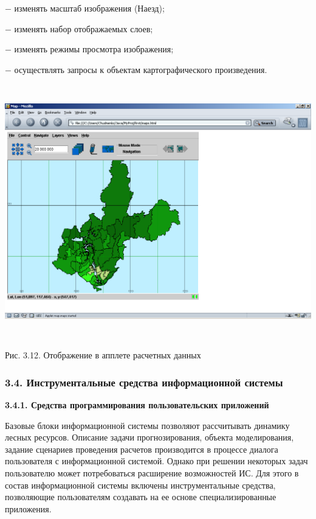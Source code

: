\documentclass{article}
\begin{document}
\ensuremath{-} изменять масштаб изображения (Наезд);

\ensuremath{-} изменять набор отображаемых слоев;

\ensuremath{-} изменять режимы просмотра изображения;

\ensuremath{-} осуществлять запросы к объектам картографического 
произведения.

\begin{center}
\includegraphics[width=445pt, height=313pt, keepaspectratio=true]{asyaDisser9_3-fig009.png}

Рис. 3.12. Отображение в апплете расчетных данных\label{HToc199746736}
\end{center}

\subsubsection*{\textbf{3.4. Инструментальные средства 
информационной системы\label{HToc199746737}}}

\textbf{3.4.1. Средства программирования пользовательских 
приложений}

Базовые блоки информационной системы позволяют 
рассчитывать динамику лесных ресурсов. Описание 
задачи прогнозирования, объекта моделирования, 
задание сценариев проведения расчетов производится 
в процессе диалога пользователя с информационной 
системой. Однако при решении некоторых задач 
пользователю может потребоваться расширение 
возможностей ИС. Для этого в состав информационной 
системы включены инструментальные средства, 
позволяющие пользователям создавать на ее 
основе специализированные приложения.
\end{document}
